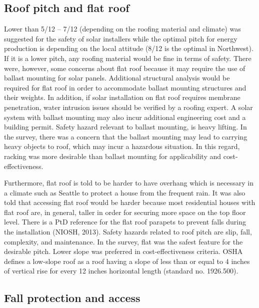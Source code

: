 \documentclass[]{article}
\begin{document}
\hypertarget{roof-pitch-and-flat-roof}{%
\subsection{Roof pitch and flat roof}\label{roof-pitch-and-flat-roof}}

Lower than 5/12 -- 7/12 (depending on the roofing material and climate)
was suggested for the safety of solar installers while the optimal pitch
for energy production is depending on the local attitude (8/12 is the
optimal in Northwest). If it is a lower pitch, any roofing material
would be fine in terms of safety. There were, however, some concerns
about flat roof because it may require the use of ballast mounting for
solar panels. Additional structural analysis would be required for flat
roof in order to accommodate ballast mounting structures and their
weights. In addition, if solar installation on flat roof requires
membrane penetration, water intrusion issues should be verified by a
roofing expert. A solar system with ballast mounting may also incur
additional engineering cost and a building permit. Safety hazard
relevant to ballast mounting, is heavy lifting. In the survey, there was
a concern that the ballast mounting may lead to carrying heavy objects
to roof, which may incur a hazardous situation. In this regard, racking
was more desirable than ballast mounting for applicability and
cost-effectiveness.

Furthermore, flat roof is told to be harder to have overhang which is
necessary in a climate such as Seattle to protect a house from the
frequent rain. It was also told that accessing flat roof would be harder
because most residential houses with flat roof are, in general, taller
in order for securing more space on the top floor level. There is a PtD
reference for the flat roof parapets to prevent falls during the
installation (NIOSH, 2013). Safety hazards related to roof pitch are
slip, fall, complexity, and maintenance. In the survey, flat was the
safest feature for the desirable pitch. Lower slope was preferred in
cost-effectiveness criteria. OSHA defines a low-slope roof as a roof
having a slope of less than or equal to 4 inches of vertical rise for
every 12 inches horizontal length (standard no. 1926.500).

\hypertarget{fall-protection-and-access}{%
\subsection{Fall protection and
access}\label{fall-protection-and-access}}
\end{document}
